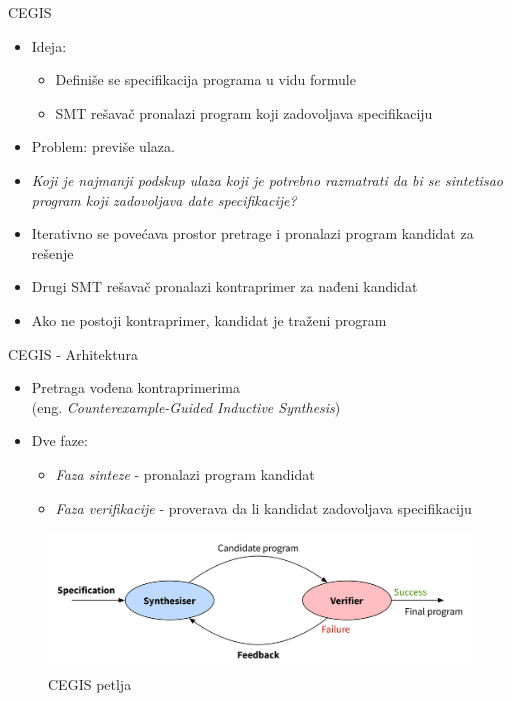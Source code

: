 
\begin{frame}{CEGIS}
    \begin{itemize}
		\item Ideja:
			\begin{itemize}
				\item Definiše se specifikacija programa u vidu formule
		    	\item SMT rešavač pronalazi program koji zadovoljava specifikaciju
			\end{itemize}
        \item Problem: previše ulaza. 
        \item \emph{Koji je najmanji podskup ulaza koji je potrebno razmatrati da bi se sintetisao program koji zadovoljava date specifikacije?}
        \item Iterativno se povećava prostor pretrage i pronalazi program kandidat za rešenje
        \item Drugi SMT rešavač pronalazi kontraprimer za nađeni kandidat
		\item Ako ne postoji kontraprimer, kandidat je traženi program
    \end{itemize}
\end{frame}

\begin{frame}[fragile]{CEGIS - Arhitektura}
    \begin{itemize}
    	\item Pretraga vođena kontraprimerima \\(eng. \emph{Counterexample-Guided Inductive Synthesis})
        \item Dve faze: 
        	\begin{itemize}
        		\item \emph{Faza sinteze} - pronalazi program kandidat
        		\item \emph{Faza verifikacije} - proverava da li kandidat zadovoljava specifikaciju 
        	\end{itemize}
    \end{itemize}
    \begin{figure}
        \begin{center}
            \includegraphics[scale=0.4]{../resources/cegis.png}
        \end{center}
        \caption{CEGIS petlja}
    \end{figure}
\end{frame}

